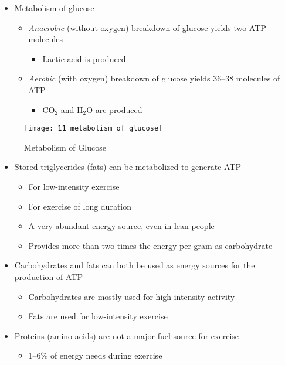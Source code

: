 \documentclass[title={Chapter 11}]{fdsn201notes}
\begin{document}
\begin{itemize}
	\item Metabolism of glucose
	\begin{itemize}
		\item \emph{Anaerobic} (without oxygen) breakdown of glucose yields two ATP molecules
		\begin{itemize}
			\item Lactic acid is produced
		\end{itemize}
	\end{itemize}
	\begin{itemize}
		\item \emph{Aerobic} (with oxygen) breakdown of glucose yields 36--38 molecules of ATP
		\begin{itemize}
			\item $\mbox{CO}_{2}$ and $\mbox{H}_{2}$O are produced
		\end{itemize}
	\end{itemize}
\end{itemize}

\begin{figure}[H]
	\centering
	\texttt{[image: 11\_metabolism\_of\_glucose]}
	\caption{Metabolism of Glucose}
	\label{fig:metabolism-of-glucose}
\end{figure}

\begin{itemize}
	\item Stored triglycerides (fats) can be metabolized to generate ATP
	\begin{itemize}
		\item For low-intensity exercise
		\item For exercise of long duration
		\item A very abundant energy source, even in lean people
		\item Provides more than two times the energy per gram as carbohydrate
	\end{itemize}
	\item Carbohydrates and fats can both be used as energy sources for the production of ATP
	\begin{itemize}
		\item Carbohydrates are mostly used for high-intensity activity
		\item Fats are used for low-intensity exercise
	\end{itemize}
	\item Proteins (amino acids) are not a major fuel source for exercise
	\begin{itemize}
		\item 1--6\% of energy needs during exercise
	\end{itemize}
\end{itemize}
\end{document}
